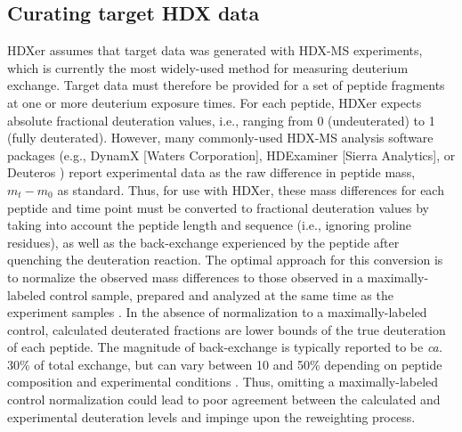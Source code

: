 \documentclass[9pt,tutorial,ASAPversion]{livecoms}
\begin{document}
\subsection{Curating target HDX data}
HDXer assumes that target data was generated with HDX-MS experiments, which is currently the most widely-used method for measuring deuterium exchange.
Target data must therefore be provided for a set of peptide fragments at one or more deuterium exposure times. 
For each peptide, HDXer expects absolute fractional deuteration values, i.e., ranging from 0 (undeuterated) to 1 (fully deuterated).
However, many commonly-used HDX-MS analysis software packages (e.g., DynamX [Waters Corporation], HDExaminer [Sierra Analytics], or Deuteros \cite{Lau2021}) report experimental data as the raw difference in peptide mass, $m_t - m_0$ as standard.
Thus, for use with HDXer, these mass differences for each peptide and time point must be converted to fractional deuteration values by taking into account the peptide length and sequence (i.e., ignoring proline residues), as well as the back-exchange experienced by the peptide after quenching the deuteration reaction.
The optimal approach for this conversion is to normalize the observed mass differences to those observed in a maximally-labeled control sample, prepared and analyzed at the same time as the experiment samples \cite{Masson2019}.
In the absence of normalization to a maximally-labeled control, calculated deuterated fractions are lower bounds of the true deuteration of each peptide.
The magnitude of back-exchange is typically reported to be \textit{ca.} 30\% of total exchange, but can vary between 10 and 50\% depending on peptide composition and experimental conditions \cite{Walters2012}.
Thus, omitting a maximally-labeled control normalization could lead to poor agreement between the calculated and experimental deuteration levels and impinge upon the reweighting process.
\end{document}

